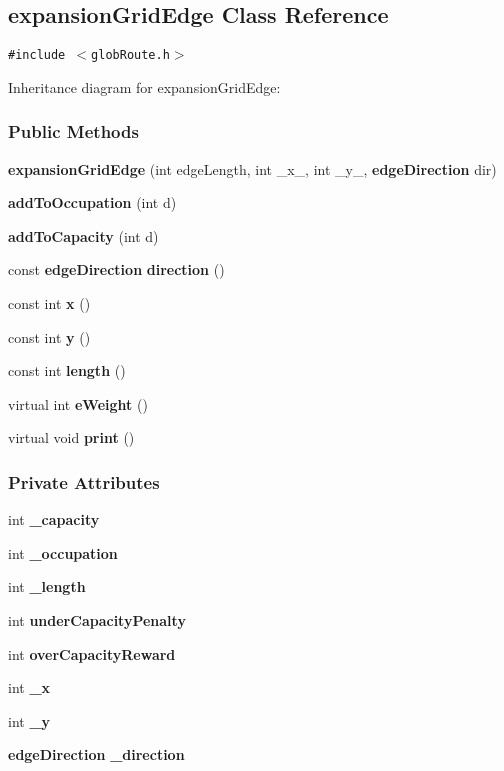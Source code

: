 \subsection{expansion\-Grid\-Edge  Class Reference}
\label{expansionGridEdge}
{\tt \#include $<$glob\-Route.h$>$}

Inheritance diagram for expansion\-Grid\-Edge:\begin{figure}[H]
\begin{center}
\leavevmode
\setlength{\epsfysize}{2cm}
\end{center}
\end{figure}
\subsubsection*{Public Methods}
\begin{CompactItemize}
\item 
{\bf expansion\-Grid\-Edge} (int edge\-Length, int \_\-x\_\-, int \_\-y\_\-, {\bf edge\-Direction} dir)
\item 
{\bf add\-To\-Occupation} (int d)
\item 
{\bf add\-To\-Capacity} (int d)
\item 
const {\bf edge\-Direction} {\bf direction} ()
\item 
const int {\bf x} ()
\item 
const int {\bf y} ()
\item 
const int {\bf length} ()
\item 
virtual int {\bf e\-Weight} ()
\item 
virtual void {\bf print} ()
\end{CompactItemize}
\subsubsection*{Private Attributes}
\begin{CompactItemize}
\item 
int {\bf \_\-capacity}
\item 
int {\bf \_\-occupation}
\item 
int {\bf \_\-length}
\item 
int {\bf under\-Capacity\-Penalty}
\item 
int {\bf over\-Capacity\-Reward}
\item 
int {\bf \_\-x}
\item 
int {\bf \_\-y}
\item 
{\bf edge\-Direction} {\bf \_\-direction}
\end{CompactItemize}


